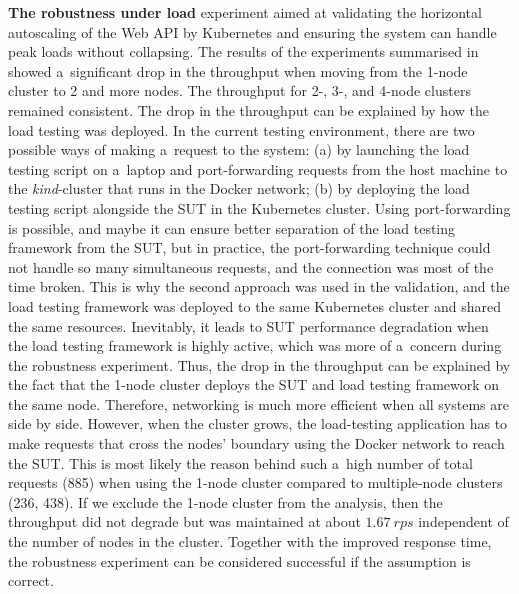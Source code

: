 \documentclass[12pt]{article}
\begin{document}
\textbf{The robustness under load} experiment aimed at validating the horizontal autoscaling of the Web API by Kubernetes and ensuring the system can handle peak loads without collapsing. The results of the experiments summarised in  showed a~significant drop in the throughput when moving from the 1-node cluster to 2 and more nodes. The throughput for 2-, 3-, and 4-node clusters remained consistent. The drop in the throughput can be explained by how the load testing was deployed. In the current testing environment, there are two possible ways of making a~request to the system: (a) by launching the load testing script on a~laptop and port-forwarding requests from the host machine to the \emph{kind}-cluster that runs in the Docker network; (b) by deploying the load testing script alongside the SUT in the Kubernetes cluster. Using port-forwarding is possible, and maybe it can ensure better separation of the load testing framework from the SUT, but in practice, the port-forwarding technique could not handle so many simultaneous requests, and the connection was most of the time broken. This is why the second approach was used in the validation, and the load testing framework was deployed to the same Kubernetes cluster and shared the same resources. Inevitably, it leads to SUT performance degradation when the load testing framework is highly active, which was more of a~concern during the robustness experiment. Thus, the drop in the throughput can be explained by the fact that the 1-node cluster deploys the SUT and load testing framework on the same node. Therefore, networking is much more efficient when all systems are side by side. However, when the cluster grows, the load-testing application has to make requests that cross the nodes' boundary using the Docker network to reach the SUT. This is most likely the reason behind such a~high number of total requests (885) when using the 1-node cluster compared to multiple-node clusters (236, 438). If we exclude the 1-node cluster from the analysis, then the throughput did not degrade but was maintained at about $1.67~rps$ independent of the number of nodes in the cluster. Together with the improved response time, the robustness experiment can be considered successful if the assumption is correct.
\end{document}
